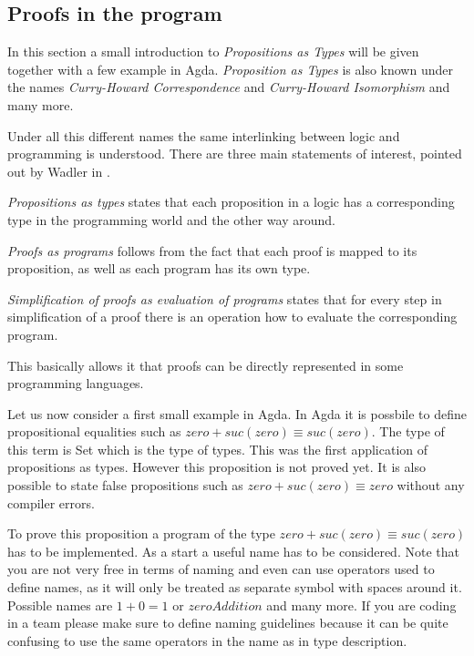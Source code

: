 \subsection{Proofs in the program}\label{section:agda_proofs}
In this section a small introduction to \emph{Propositions as Types}\cite{10.1145/2699407} will be given together with a few example in Agda. \emph{Proposition as Types} is also known under the names \emph{Curry-Howard Correspondence}\cite{10.5555/1076265} and \emph{Curry-Howard Isomorphism}\cite{10.1145/2841316} and many more.

Under all this different names the same interlinking between logic and programming is understood. There are three main statements of interest, pointed out by Wadler in \cite{10.1145/2699407}.

\emph{Propositions as types} states that each proposition in a logic has a corresponding type in the programming world and the other way around. 

\emph{Proofs as programs} follows from the fact that each proof is mapped to its proposition, as well as each program has its own type.

\emph{Simplification of proofs as evaluation of programs} states that for every step in simplification of a proof there is an operation how to evaluate the corresponding program.

This basically allows it that proofs can be directly represented in some programming languages.

Let us now consider a first small example in Agda.
In Agda it is possbile to define propositional equalities such as $zero + suc(zero) \equiv suc(zero)$. The type of this term is Set which is the type of types. This was the first application of propositions as types.
However this proposition is not proved yet. It is also possible to state false propositions such as $zero + suc(zero) \equiv zero$ without any compiler errors.

To prove this proposition a program of the type $zero + suc(zero) \equiv suc(zero)$ has to be implemented.
As a start a useful name has to be considered. Note that you are not very free in terms of naming and even can use operators used to define names, as it will only be treated as separate symbol with spaces around it. Possible names are $1+0=1$ or $zeroAddition$ and many more. 
If you are coding in a team please make sure to define naming guidelines because it can be quite confusing to use the same operators in the name as in type description.

